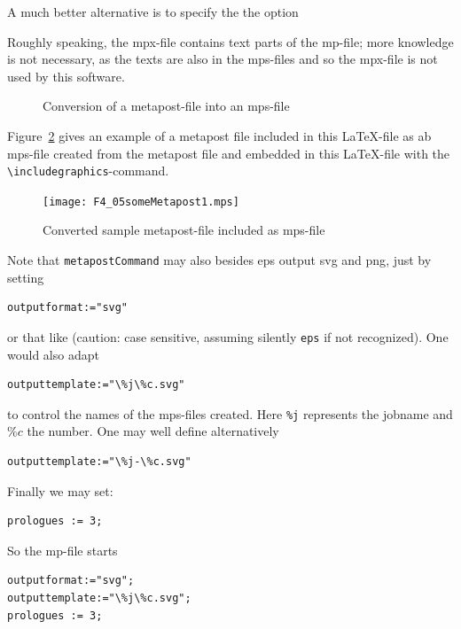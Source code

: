 \documentclass[12pt]{book}
\begin{document}
A much better alternative is to specify the the option 


Roughly speaking, the mpx-file contains text parts of the mp-file; 
more knowledge is not necessary, as the texts are also in the mps-files 
and so the mpx-file is not used by this software. 

\begin{figure}[htb]
\begin{center}

\end{center}
\caption{\label{fig:mp2mps}Conversion of a metapost-file into an mps-file}
\end{figure}


Figure~\ref{fig:metapost} gives an example of a metapost file 
included in this \LaTeX-file as ab mps-file 
created from the metapost file 
and embedded in this \LaTeX-file 
with the {\tt\textbackslash includegraphics}-command. 

\begin{figure}[htb]
\begin{center}
\texttt{[image: F4\_05someMetapost1.mps]}
\end{center}
\caption{\label{fig:metapost}
Converted sample metapost-file included as mps-file  }
\end{figure}

Note that {\tt metapostCommand} may also besides \gls{eps} 
output \gls{svg} and \gls{png}, 
just by setting 
%
\begin{verbatim}
outputformat:="svg" 
\end{verbatim}
%
or that like 
(caution: case sensitive, assuming silently {\tt eps} if not recognized). 
One would also adapt 
%
\begin{verbatim}
outputtemplate:="\%j\%c.svg"
\end{verbatim}
%
to control the names of the mps-files created. 
Here {\tt\%j} represents the jobname and $\%c$ the number. 
One may well define alternatively 
%
\begin{verbatim}
outputtemplate:="\%j-\%c.svg"
\end{verbatim}

Finally we may set: 
%
\begin{verbatim}
prologues := 3;
\end{verbatim}

So the mp-file starts 
%
\lstset{language=metapost, basicstyle=\normalsize}
\begin{lstlisting}
outputformat:="svg";
outputtemplate:="\%j\%c.svg";
prologues := 3;
\end{lstlisting}
\end{document}
